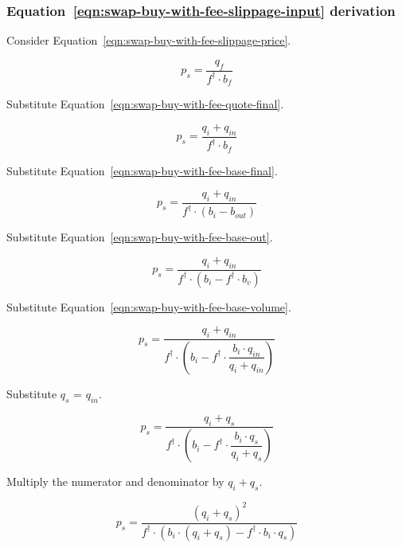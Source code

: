 \subsubsection{Equation~\ref{eqn:swap-buy-with-fee-slippage-input} derivation}%
\label{sssec:equation-eqn-swap-buy-with-fee-slippage-input-derivation}

Consider Equation~\ref{eqn:swap-buy-with-fee-slippage-price}.

\begin{equation*}
	p_s = \frac{q_f}{f^{\dagger} \cdot b_f}
\end{equation*}

Substitute Equation~\ref{eqn:swap-buy-with-fee-quote-final}.

\begin{equation*}
	p_s = \frac{q_i + q_{in}}{f^{\dagger} \cdot b_f}
\end{equation*}

Substitute Equation~\ref{eqn:swap-buy-with-fee-base-final}.

\begin{equation*}
	p_s = \frac{q_i + q_{in}}{f^{\dagger} \cdot (b_i - b_{out})}
\end{equation*}

Substitute Equation~\ref{eqn:swap-buy-with-fee-base-out}.

\begin{equation*}
	p_s = \frac{q_i + q_{in}}{f^{\dagger} \cdot (b_i - f^{\dagger} \cdot b_v)}
\end{equation*}

Substitute Equation~\ref{eqn:swap-buy-with-fee-base-volume}.

\begin{equation*}
	p_s = \frac{q_i + q_{in}}{f^{\dagger} \cdot
		\left(b_i - f^{\dagger} \cdot \dfrac{b_i \cdot q_{in}}{q_i + q_{in}}\right)}
\end{equation*}

Substitute $q_s$ = $q_{in}$.

\begin{equation*}
	p_s = \frac{q_i + q_s}{f^{\dagger} \cdot
		\left(b_i - f^{\dagger} \cdot \dfrac{b_i \cdot q_s}{q_i + q_s}\right)}
\end{equation*}

Multiply the numerator and denominator by $q_i + q_s$.

\begin{equation*}
	p_s = \frac{{(q_i + q_s)}^2}{f^{\dagger} \cdot
		\left(b_i \cdot (q_i + q_s) - f^{\dagger} \cdot b_i \cdot q_s\right)}
\end{equation*}

